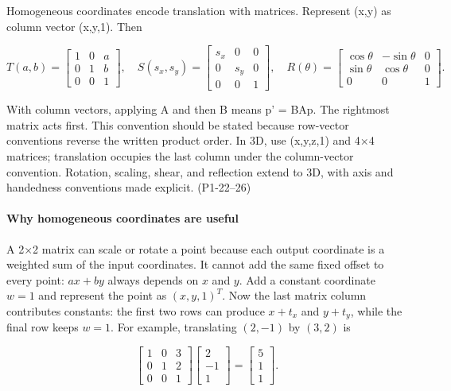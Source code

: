 Homogeneous coordinates encode translation with matrices. Represent (x,y) as column vector (x,y,1). Then

\[
T(a,b)=\begin{bmatrix}1&0&a\\0&1&b\\0&0&1\end{bmatrix},\quad
S(s_x,s_y)=\begin{bmatrix}s_x&0&0\\0&s_y&0\\0&0&1\end{bmatrix},\quad
R(\theta)=\begin{bmatrix}\cos\theta&-\sin\theta&0\\\sin\theta&\cos\theta&0\\0&0&1\end{bmatrix}.
\]

With column vectors, applying A and then B means p' = BAp. The rightmost matrix acts first. This convention should be stated because row-vector conventions reverse the written product order. In 3D, use (x,y,z,1) and 4×4 matrices; translation occupies the last column under the column-vector convention. Rotation, scaling, shear, and reflection extend to 3D, with axis and handedness conventions made explicit. (P1-22--26)

\paragraph{Why homogeneous coordinates are useful}\label{why-homogeneous-coordinates-are-useful}

A 2×2 matrix can scale or rotate a point because each output coordinate is a weighted sum of the input coordinates. It cannot add the same fixed offset to every point: \(ax+by\) always depends on \(x\) and \(y\). Add a constant coordinate \(w=1\) and represent the point as \((x,y,1)^T\). Now the last matrix column contributes constants: the first two rows can produce \(x+t_x\) and \(y+t_y\), while the final row keeps \(w=1\). For example, translating \((2,-1)\) by \((3,2)\) is

\[
\begin{bmatrix}1&0&3\\0&1&2\\0&0&1\end{bmatrix}
\begin{bmatrix}2\\-1\\1\end{bmatrix}
=
\begin{bmatrix}5\\1\\1\end{bmatrix}.
\]

